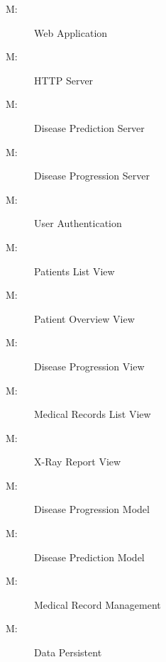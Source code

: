 \documentclass[12pt, titlepage]{article}
\newcounter{mnum}
\newcommand{\mthemnum}{M\themnum}
\begin{document}
\begin{description}
\item [ \mthemnum \label{mWebApp}:] Web Application 
\item [ \mthemnum \label{mHTTP}:] HTTP Server 
\item [ \mthemnum \label{mDiseasePredict}:] Disease Prediction Server 
\item [ \mthemnum \label{mDiseaseProgress}:] Disease Progression Server
\item [ \mthemnum \label{mAuth}:] User Authentication 
\item [ \mthemnum \label{mPatientList}:] Patients List View 
\item [ \mthemnum \label{mPatientOverview}:] Patient Overview View 
\item [ \mthemnum \label{mProgressView}:] Disease Progression View 
\item [ \mthemnum \label{mRecordsList}:] Medical Records List View
\item [ \mthemnum \label{mReportView}:] X-Ray Report View
\item [ \mthemnum \label{mProgressModel}:] Disease Progression Model 
\item [ \mthemnum \label{mPredictModel}:] Disease Prediction Model
\item [ \mthemnum \label{mRecord}:] Medical Record Management
\item [ \mthemnum \label{mDataStore}:] Data Persistent 
\end{description}
\end{document}
